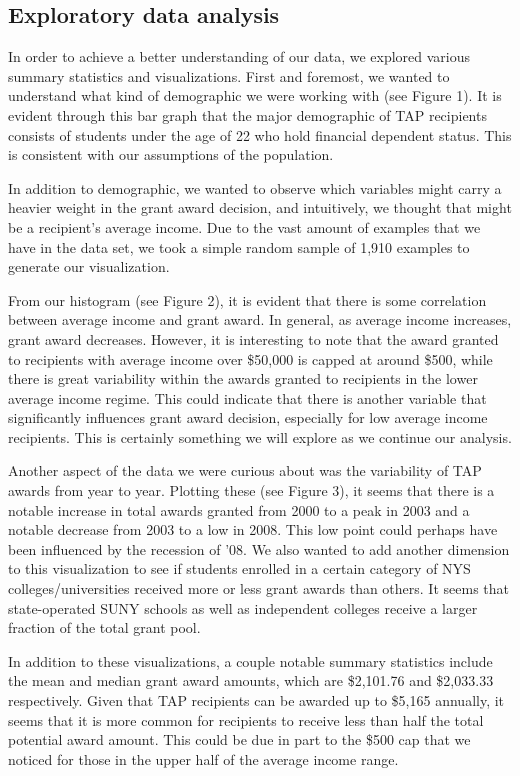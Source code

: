 \documentclass[11pt, fleqn]{article}
\begin{document}
\subsection{Exploratory data analysis}
In order to achieve a better understanding of our data, we explored various summary statistics and visualizations. First and foremost, we wanted to understand what kind of demographic we were working with (see Figure 1). It is evident through this bar graph that the major demographic of TAP recipients consists of students under the age of 22 who hold financial dependent status. This is consistent with our assumptions of the population.

In addition to demographic, we wanted to observe which variables might carry a heavier weight in the grant award decision, and intuitively, we thought that might be a recipient’s average income. Due to the vast amount of examples that we have in the data set, we took a simple random sample of 1,910 examples to generate our visualization.


From our histogram (see Figure 2), it is evident that there is some correlation between average income and grant award. In general, as average income increases, grant award decreases. However, it is interesting to note that the award granted to recipients with average income over \$50,000 is capped at around \$500, while there is great variability within the awards granted to recipients in the lower average income regime. This could indicate that there is another variable that significantly influences grant award decision, especially for low average income recipients. This is certainly something we will explore as we continue our analysis.

Another aspect of the data we were curious about was the variability of TAP awards from year to year. Plotting these (see Figure 3), it seems that there is a notable increase in total awards granted from 2000 to a peak in 2003 and a notable decrease from 2003 to a low in 2008. This low point could perhaps have been influenced by the recession of '08. We also wanted to add another dimension to this visualization to see if students enrolled in a certain category of NYS colleges/universities received more or less grant awards than others. It seems that state-operated SUNY schools as well as independent colleges receive a larger fraction of the total grant pool. 

In addition to these visualizations, a couple notable summary statistics include the mean and median grant award amounts, which are \$2,101.76 and \$2,033.33 respectively. Given that TAP recipients can be awarded up to \$5,165 annually, it seems that it is more common for recipients to receive less than half the total potential award amount. This could be due in part to the \$500 cap that we noticed for those in the upper half of the average income range.
\end{document}
